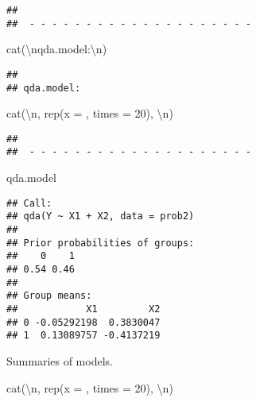 \documentclass[
]{article}
\newenvironment{Shaded}{\begin{snugshade}}{\end{snugshade}}
\newcommand{\AttributeTok}[1]{\textcolor[rgb]{0.77,0.63,0.00}{#1}}
\newcommand{\DecValTok}[1]{\textcolor[rgb]{0.00,0.00,0.81}{#1}}
\newcommand{\FunctionTok}[1]{\textcolor[rgb]{0.00,0.00,0.00}{#1}}
\newcommand{\NormalTok}[1]{#1}
\newcommand{\SpecialCharTok}[1]{\textcolor[rgb]{0.00,0.00,0.00}{#1}}
\newcommand{\StringTok}[1]{\textcolor[rgb]{0.31,0.60,0.02}{#1}}
\begin{document}
\begin{verbatim}
## 
##  - - - - - - - - - - - - - - - - - - - -
\end{verbatim}

\begin{Shaded}
\begin{Highlighting}[]
\FunctionTok{cat}\NormalTok{(}\StringTok{\textquotesingle{}}\SpecialCharTok{\textbackslash{}n}\StringTok{qda.model:}\SpecialCharTok{\textbackslash{}n}\StringTok{\textquotesingle{}}\NormalTok{)}
\end{Highlighting}
\end{Shaded}

\begin{verbatim}
## 
## qda.model:
\end{verbatim}

\begin{Shaded}
\begin{Highlighting}[]
\FunctionTok{cat}\NormalTok{(}\StringTok{\textquotesingle{}}\SpecialCharTok{\textbackslash{}n}\StringTok{\textquotesingle{}}\NormalTok{, }\FunctionTok{rep}\NormalTok{(}\AttributeTok{x =} \StringTok{\textquotesingle{}{-}\textquotesingle{}}\NormalTok{, }\AttributeTok{times =} \DecValTok{20}\NormalTok{), }\StringTok{\textquotesingle{}}\SpecialCharTok{\textbackslash{}n}\StringTok{\textquotesingle{}}\NormalTok{)}
\end{Highlighting}
\end{Shaded}

\begin{verbatim}
## 
##  - - - - - - - - - - - - - - - - - - - -
\end{verbatim}

\begin{Shaded}
\begin{Highlighting}[]
\NormalTok{qda.model}
\end{Highlighting}
\end{Shaded}

\begin{verbatim}
## Call:
## qda(Y ~ X1 + X2, data = prob2)
## 
## Prior probabilities of groups:
##    0    1 
## 0.54 0.46 
## 
## Group means:
##            X1         X2
## 0 -0.05292198  0.3830047
## 1  0.13089757 -0.4137219
\end{verbatim}

Summaries of models.

\begin{Shaded}
\begin{Highlighting}[]
\FunctionTok{cat}\NormalTok{(}\StringTok{\textquotesingle{}}\SpecialCharTok{\textbackslash{}n}\StringTok{\textquotesingle{}}\NormalTok{, }\FunctionTok{rep}\NormalTok{(}\AttributeTok{x =} \StringTok{\textquotesingle{}{-}\textquotesingle{}}\NormalTok{, }\AttributeTok{times =} \DecValTok{20}\NormalTok{), }\StringTok{\textquotesingle{}}\SpecialCharTok{\textbackslash{}n}\StringTok{\textquotesingle{}}\NormalTok{)}
\end{Highlighting}
\end{Shaded}
\end{document}
